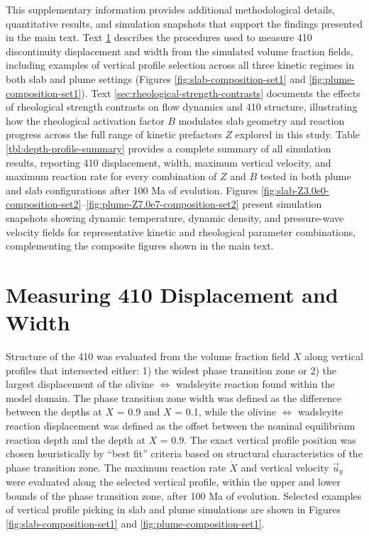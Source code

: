 \documentclass[draft,linenumbers]{agujournal2019}
\begin{document}
This supplementary information provides additional methodological
details, quantitative results, and simulation snapshots that support the
findings presented in the main text. Text
\ref{sec:measuring-displacement-width} describes the procedures used to
measure 410 discontinuity displacement and width from the simulated
volume fraction fields, including examples of vertical profile selection
across all three kinetic regimes in both slab and plume settings
(Figures \ref{fig:slab-composition-set1} and
\ref{fig:plume-composition-set1}). Text
\ref{sec:rheological-strength-contrasts} documents the effects of
rheological strength contrasts on flow dynamics and 410 structure,
illustrating how the rheological activation factor \(B\) modulates slab
geometry and reaction progress across the full range of kinetic
prefactors \(Z\) explored in this study. Table
\ref{tbl:depth-profile-summary} provides a complete summary of all
simulation results, reporting 410 displacement, width, maximum vertical
velocity, and maximum reaction rate for every combination of \(Z\) and
\(B\) tested in both plume and slab configurations after 100 Ma of
evolution. Figures
\ref{fig:slab-Z3.0e0-composition-set2}--\ref{fig:plume-Z7.0e7-composition-set2}
present simulation snapshots showing dynamic temperature, dynamic
density, and pressure-wave velocity fields for representative kinetic
and rheological parameter combinations, complementing the composite
figures shown in the main text.

\section{Measuring 410 Displacement and
Width}\label{sec:measuring-displacement-width}

Structure of the 410 was evaluated from the volume fraction field \(X\)
along vertical profiles that intersected either: 1) the widest phase
transition zone or 2) the largest displacement of the olivine
\(\Leftrightarrow\) wadsleyite reaction found within the model domain.
The phase transition zone width was defined as the difference between
the depths at \(X\) = 0.9 and \(X\) = 0.1, while the olivine
\(\Leftrightarrow\) wadsleyite reaction displacement was defined as the
offset between the nominal equilibrium reaction depth and the depth at
\(X\) = 0.9. The exact vertical profile position was chosen
heuristically by ``best fit'' criteria based on structural
characteristics of the phase transition zone. The maximum reaction rate
\(\dot{X}\) and vertical velocity \(\vec{u}_y\) were evaluated along the
selected vertical profile, within the upper and lower bounds of the
phase transition zone, after 100 Ma of evolution. Selected examples of
vertical profile picking in slab and plume simulations are shown in
Figures \ref{fig:slab-composition-set1} and
\ref{fig:plume-composition-set1}.
\end{document}
